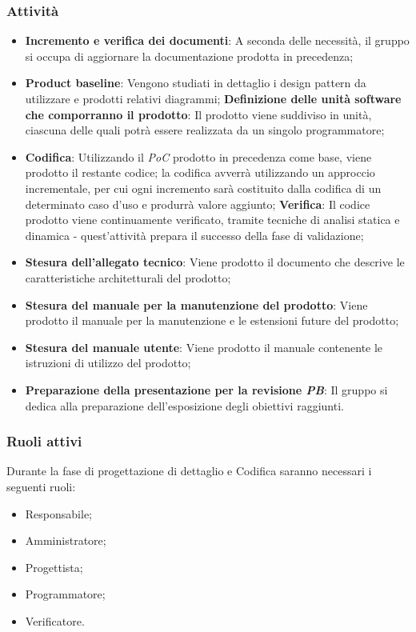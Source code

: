 \subsubsection{Attività}
\begin{itemize}
    \item \textbf{Incremento e verifica dei documenti}: A seconda delle necessità, il gruppo si occupa di aggiornare la documentazione prodotta in precedenza;
    \item \textbf{Product baseline}: Vengono studiati in dettaglio i design pattern da utilizzare e prodotti relativi diagrammi;
        \subitem \textbf{Definizione delle unità software che comporranno il prodotto}: Il prodotto viene suddiviso in unità, ciascuna delle quali potrà essere realizzata da un singolo programmatore;
    \item \textbf{Codifica}: Utilizzando il \textit{PoC} prodotto in precedenza come base, viene prodotto il restante codice; la codifica avverrà utilizzando un approccio incrementale, per cui ogni incremento sarà costituito dalla codifica di un determinato caso d’uso e produrrà valore aggiunto;
        \subitem \textbf{Verifica}: Il codice prodotto viene continuamente verificato, tramite tecniche di analisi statica e dinamica - quest’attività prepara il successo della fase di validazione;
    \item \textbf{Stesura dell’allegato tecnico}: Viene prodotto il documento che descrive le caratteristiche architetturali del prodotto;
    \item \textbf{Stesura del manuale per la manutenzione del prodotto}: Viene prodotto il manuale per la manutenzione e le estensioni future del prodotto;
    \item \textbf{Stesura del manuale utente}: Viene prodotto il manuale contenente le istruzioni di utilizzo del prodotto;
    \item \textbf{Preparazione della presentazione per la revisione \textit{PB}}: Il gruppo si dedica alla preparazione dell’esposizione degli obiettivi raggiunti.
\end{itemize}

\subsubsection{Ruoli attivi}
Durante la fase di progettazione di dettaglio e Codifica saranno necessari i seguenti ruoli:
\begin{itemize}
	\item Responsabile;
    \item Amministratore;
    \item Progettista;
    \item Programmatore;
    \item Verificatore.
\end{itemize}

